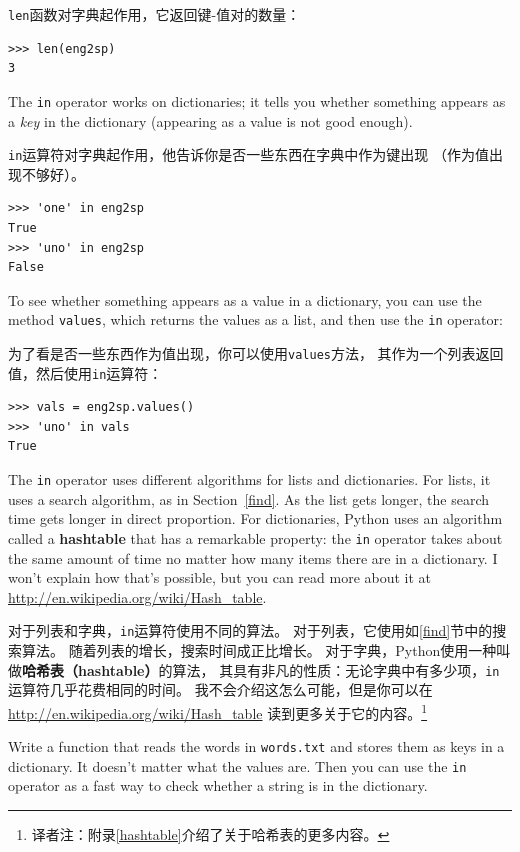 \documentclass[10pt]{book}
\begin{document}
\begin{CJK}{UTF8}{gbsn}
{\tt len}函数对字典起作用，它返回键-值对的数量：

\begin{verbatim}
>>> len(eng2sp)
3
\end{verbatim}
%
The {\tt in} operator works on dictionaries; it tells you whether
something appears as a {\em key} in the dictionary (appearing
as a value is not good enough).

{\tt in}运算符对字典起作用，他告诉你是否一些东西在字典中作为键出现
（作为值出现不够好）。

\begin{verbatim}
>>> 'one' in eng2sp
True
>>> 'uno' in eng2sp
False
\end{verbatim}
%
To see whether something appears as a value in a dictionary, you
can use the method {\tt values}, which returns the values as
a list, and then use the {\tt in} operator:

为了看是否一些东西作为值出现，你可以使用{\tt values}方法，
其作为一个列表返回值，然后使用{\tt in}运算符：

\begin{verbatim}
>>> vals = eng2sp.values()
>>> 'uno' in vals
True
\end{verbatim}
%
The {\tt in} operator uses different algorithms for lists and
dictionaries.  For lists, it uses a search algorithm, as in
Section~\ref{find}.  As the list gets longer, the search time gets
longer in direct proportion.  For dictionaries, Python uses an
algorithm called a {\bf hashtable} that has a remarkable property: the
{\tt in} operator takes about the same amount of time no matter how
many items there are in a dictionary.  I won't explain how that's
possible, but you can read more about it at
\url{http://en.wikipedia.org/wiki/Hash_table}.

对于列表和字典，{\tt in}运算符使用不同的算法。
对于列表，它使用如\ref{find}节中的搜索算法。
随着列表的增长，搜索时间成正比增长。
对于字典，Python使用一种叫做{\bf 哈希表（hashtable）}的算法，
其具有非凡的性质：无论字典中有多少项，{\tt in}运算符几乎花费相同的时间。
我不会介绍这怎么可能，但是你可以在\url{http://en.wikipedia.org/wiki/Hash_table}
读到更多关于它的内容。\footnote{译者注：附录\ref{hashtable}介绍了关于哈希表的更多内容。}

\begin{exercise}
\label{wordlist2}

Write a function that reads the words in {\tt words.txt} and
stores them as keys in a dictionary.  It doesn't matter what the
values are.  Then you can use the {\tt in} operator
as a fast way to check whether a string is in
the dictionary.


\end{exercise}
\end{CJK}
\end{document}
